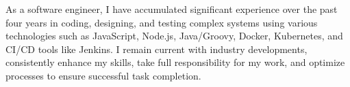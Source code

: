 

\begin{cvparagraph}

As a software engineer, I have accumulated significant experience over the past four years in coding, designing, and testing complex systems using various technologies such as JavaScript, Node.js, Java/Groovy, Docker, Kubernetes, and CI/CD tools like Jenkins. I remain current with industry developments, consistently enhance my skills, take full responsibility for my work, and optimize processes to ensure successful task completion.
\end{cvparagraph}